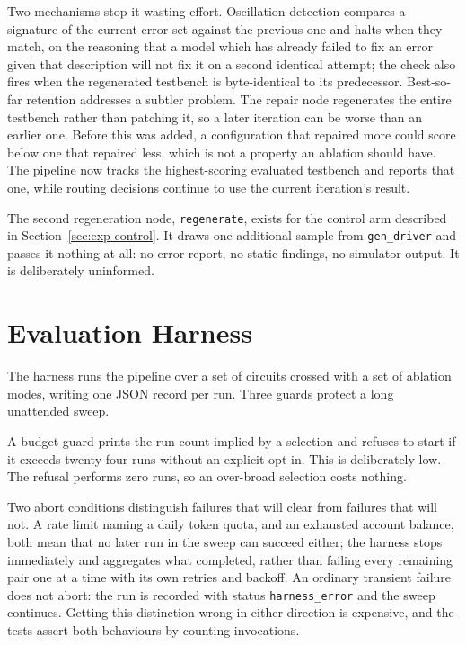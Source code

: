 \documentclass[11pt,a4paper,titlepage=false]{scrreprt}
\begin{document}
Two mechanisms stop it wasting effort. Oscillation detection compares a signature of the
current error set against the previous one and halts when they match, on the reasoning that
a model which has already failed to fix an error given that description will not fix it on
a second identical attempt; the check also fires when the regenerated testbench is
byte-identical to its predecessor. Best-so-far retention addresses a subtler problem. The
repair node regenerates the entire testbench rather than patching it, so a later iteration
can be worse than an earlier one. Before this was added, a configuration that repaired more
could score below one that repaired less, which is not a property an ablation should have.
The pipeline now tracks the highest-scoring evaluated testbench and reports that one, while
routing decisions continue to use the current iteration's result.

The second regeneration node, \texttt{regenerate}, exists for the control arm described in
Section~\ref{sec:exp-control}. It draws one additional sample from \texttt{gen\_driver} and
passes it nothing at all: no error report, no static findings, no simulator output. It is
deliberately uninformed.

\section{Evaluation Harness}\label{sec:design-harness}

The harness runs the pipeline over a set of circuits crossed with a set of ablation modes,
writing one JSON record per run. Three guards protect a long unattended sweep.

A budget guard prints the run count implied by a selection and refuses to start if it
exceeds twenty-four runs without an explicit opt-in. This is deliberately low. The refusal
performs zero runs, so an over-broad selection costs nothing.

Two abort conditions distinguish failures that will clear from failures that will not. A
rate limit naming a daily token quota, and an exhausted account balance, both mean that no
later run in the sweep can succeed either; the harness stops immediately and aggregates
what completed, rather than failing every remaining pair one at a time with its own retries
and backoff. An ordinary transient failure does not abort: the run is recorded with status
\texttt{harness\_error} and the sweep continues. Getting this distinction wrong in either
direction is expensive, and the tests assert both behaviours by counting invocations.
\end{document}
